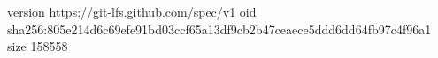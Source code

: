 version https://git-lfs.github.com/spec/v1
oid sha256:805e214d6c69efe91bd03ccf65a13df9cb2b47ceaece5ddd6dd64fb97c4f96a1
size 158558

